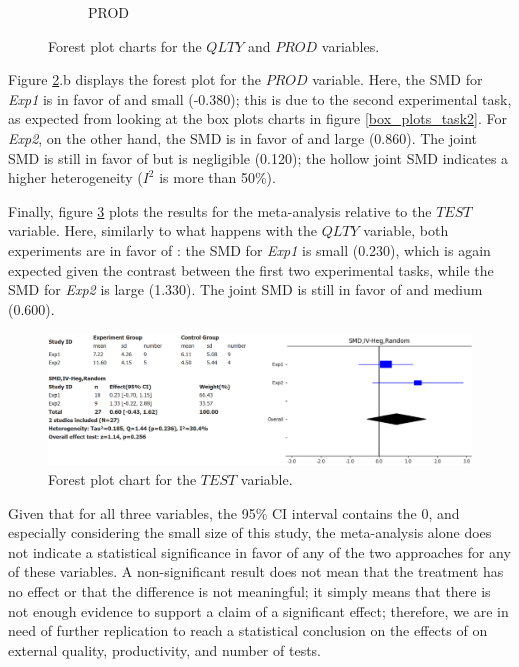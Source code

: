 \begin{figure}[H]
\begin{subfigure}{0.49\textwidth}
        \caption{PROD}
        \label{fp_prod}
    \end{subfigure}
    \caption{Forest plot charts for the $QLTY$ and $PROD$ variables.}
    \label{fp_qlty_prod}
\end{figure}

Figure \ref{fp_qlty_prod}.b displays the forest plot for the $PROD$ variable. Here, the SMD for \textit{Exp1} is in favor of \notdd and small (-0.380); this is due to the second experimental task, as expected from looking at the box plots charts in figure \ref{box_plots_task2}. For \textit{Exp2}, on the other hand, the SMD is in favor of \tdd and large (0.860). The joint SMD is still in favor of \tdd but is negligible (0.120); the hollow joint SMD indicates a higher heterogeneity ($I^2$ is more than 50\%).

Finally, figure \ref{fp_test} plots the results for the meta-analysis relative to the $TEST$ variable. Here, similarly to what happens with the $QLTY$ variable, both experiments are in favor of \tdd: the SMD for \textit{Exp1} is small (0.230), which is again expected given the contrast between the first two experimental tasks, while the SMD for \textit{Exp2} is large (1.330). The joint SMD is still in favor of \tdd and medium (0.600).

\begin{figure}[H]
    \includegraphics[width=\linewidth]{figures/forest_plots/TEST.png}
    \caption{Forest plot chart for the $TEST$ variable.}
    \label{fp_test}
\end{figure}\hfil
    
Given that for all three variables, the 95\% CI interval contains the 0, and especially considering the small size of this study, the meta-analysis alone does not indicate a statistical significance in favor of any of the two approaches for any of these variables.
A non-significant result does not mean that the treatment has no effect or that the difference is not meaningful; it simply means that there is not enough evidence to support a claim of a significant effect; therefore, we are in need of further replication to reach a statistical conclusion on the effects of \tdd on external quality, productivity, and number of tests.




